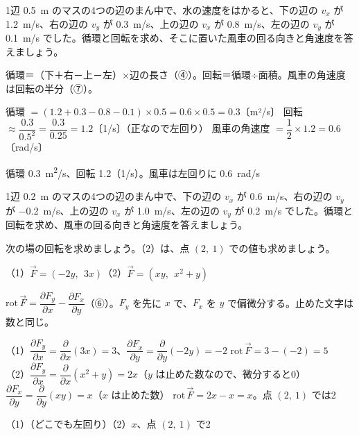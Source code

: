 \begin{reidai}
1辺 \qty{0.5}{m} のマスの4つの辺のまん中で、水の速度をはかると、下の辺の $v_x$ が \qty{1.2}{m/s}、右の辺の $v_y$ が \qty{0.3}{m/s}、上の辺の $v_x$ が \qty{0.8}{m/s}、左の辺の $v_y$ が \qty{0.1}{m/s} でした。循環と回転を求め、そこに置いた風車の回る向きと角速度を答えましょう。\par
\kangaekata 循環＝（下＋右－上－左）×辺の長さ（④）。回転＝循環÷面積。風車の角速度は回転の半分（⑦）。\par
\shiki 循環 $=(1.2+0.3-0.8-0.1)\times0.5=0.6\times0.5=0.3$〔m²/s〕\kviiikq
回転 $\approx\dfrac{0.3}{0.5^2}=\dfrac{0.3}{0.25}=1.2$〔1/s〕（正なので左回り）\kviiikq
風車の角速度 $=\dfrac{1}{2}\times1.2=0.6$〔rad/s〕\par
\kotae 循環 \qty{0.3}{m^2/s}、回転 1.2（1/s）。風車は左回りに \qty{0.6}{rad/s}
\end{reidai}

\begin{jibun}
1辺 \qty{0.2}{m} のマスの4つの辺のまん中で、下の辺の $v_x$ が \qty{0.6}{m/s}、右の辺の $v_y$ が \qty{-0.2}{m/s}、上の辺の $v_x$ が \qty{1.0}{m/s}、左の辺の $v_y$ が \qty{0.2}{m/s} でした。循環と回転を求め、風車の回る向きと角速度を答えましょう。
\end{jibun}

\begin{reidai}
次の場の回転を求めましょう。（2）は、点 $(2,\ 1)$ での値も求めましょう。\par
（1）\nobreak $\vec F=(-2y,\ \ 3x)$\qquad（2）\nobreak $\vec F=(xy,\ \ x^2+y)$\par
\kangaekata $\mathrm{rot}\,\vec F=\dfrac{\partial F_y}{\partial x}-\dfrac{\partial F_x}{\partial y}$（⑥）。$F_y$ を先に $x$ で、$F_x$ を $y$ で偏微分する。止めた文字は数と同じ。\par
\shiki（1）$\dfrac{\partial F_y}{\partial x}=\dfrac{\partial}{\partial x}(3x)=3$、$\dfrac{\partial F_x}{\partial y}=\dfrac{\partial}{\partial y}(-2y)=-2$\kviiikq
$\mathrm{rot}\,\vec F=3-(-2)=5$\kviiikq
（2）$\dfrac{\partial F_y}{\partial x}=\dfrac{\partial}{\partial x}(x^2+y)=2x$（$y$ は止めた数なので、微分すると0）\kviiikq
$\dfrac{\partial F_x}{\partial y}=\dfrac{\partial}{\partial y}(xy)=x$（$x$ は止めた数）\kviiikq
$\mathrm{rot}\,\vec F=2x-x=x$。点 $(2,\ 1)$ では2\par
\kotae（1）（どこでも左回り）\quad（2）\nobreak $x$、点 $(2,\ 1)$ で2
\end{reidai}

